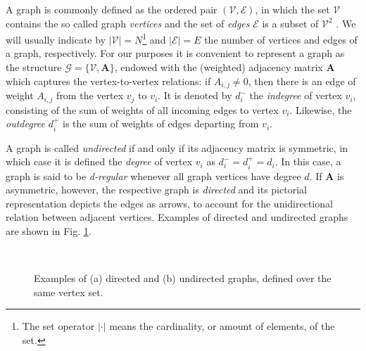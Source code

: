A graph is commonly defined as the ordered pair  $ (\mathcal{V},\mathcal{E}) $, in which the set $ \mathcal{V} $ contains the so called graph \emph{vertices} and the set of \emph{edges} $ \mathcal{E} $ is a subset of $ \mathcal{V}^2 $ \cite{feofiloff2011introduccao}.  We will usually indicate by $ |\mathcal{V}| = N $\footnote{The set operator $ |\cdot| $ means the cardinality, or amount of elements, of the set.} and $ |\mathcal{E}| = E $ the number of vertices and edges of a graph, respectively. For our purposes it is convenient to represent a graph as the structure $ \mathcal{G} = \{\mathcal{V}, \mathbf{A}\} $, endowed with the (weighted) adjacency matrix $ \mathbf{A} $ which captures the vertex-to-vertex relations: if $ A_{i,j} \neq 0$, then there is an edge of weight $ A_{i,j} $ from the vertex $ v_j $ to $ v_i $. It is denoted by $ d_i^- $ the \emph{indegree} of vertex $ v_i $, consisting of the sum of weights of all incoming edges to vertex $ v_i $. Likewise, the \emph{outdegree} $ d^+_i $ is the sum of weights of edges departing from $ v_i $.

A graph is called \emph{undirected} if and only if its adjacency matrix is symmetric, in which case it is defined the \emph{degree} of vertex $ v_i $ as $ d_i^- = d_i^+ = d_i $. In this case, a graph is said to be \emph{d-regular} whenever all graph vertices have degree $ d $\label{pag:regular}. If $ \mathbf{A} $ is asymmetric, however, the respective graph is \emph{directed} and its pictorial representation depicts the edges as arrows, to account for the unidirectional relation between adjacent vertices. Examples of directed and undirected graphs are shown in Fig. \ref{fig:example_graphs}.

\begin{figure}
	\centering
    \caption{Examples of (a) directed and (b) undirected graphs, defined over the same vertex set.}
	~
	\floatsource
	\label{fig:example_graphs}
\end{figure}

